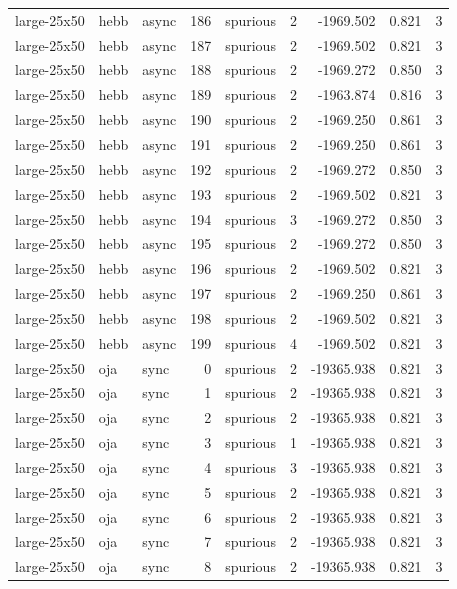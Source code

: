 \begin{tabular}{lllrlrrrr}
large-25x50 & hebb & async & 186 & spurious & 2 & -1969.502 & 0.821 & 3 \\
large-25x50 & hebb & async & 187 & spurious & 2 & -1969.502 & 0.821 & 3 \\
large-25x50 & hebb & async & 188 & spurious & 2 & -1969.272 & 0.850 & 3 \\
large-25x50 & hebb & async & 189 & spurious & 2 & -1963.874 & 0.816 & 3 \\
large-25x50 & hebb & async & 190 & spurious & 2 & -1969.250 & 0.861 & 3 \\
large-25x50 & hebb & async & 191 & spurious & 2 & -1969.250 & 0.861 & 3 \\
large-25x50 & hebb & async & 192 & spurious & 2 & -1969.272 & 0.850 & 3 \\
large-25x50 & hebb & async & 193 & spurious & 2 & -1969.502 & 0.821 & 3 \\
large-25x50 & hebb & async & 194 & spurious & 3 & -1969.272 & 0.850 & 3 \\
large-25x50 & hebb & async & 195 & spurious & 2 & -1969.272 & 0.850 & 3 \\
large-25x50 & hebb & async & 196 & spurious & 2 & -1969.502 & 0.821 & 3 \\
large-25x50 & hebb & async & 197 & spurious & 2 & -1969.250 & 0.861 & 3 \\
large-25x50 & hebb & async & 198 & spurious & 2 & -1969.502 & 0.821 & 3 \\
large-25x50 & hebb & async & 199 & spurious & 4 & -1969.502 & 0.821 & 3 \\
large-25x50 & oja & sync & 0 & spurious & 2 & -19365.938 & 0.821 & 3 \\
large-25x50 & oja & sync & 1 & spurious & 2 & -19365.938 & 0.821 & 3 \\
large-25x50 & oja & sync & 2 & spurious & 2 & -19365.938 & 0.821 & 3 \\
large-25x50 & oja & sync & 3 & spurious & 1 & -19365.938 & 0.821 & 3 \\
large-25x50 & oja & sync & 4 & spurious & 3 & -19365.938 & 0.821 & 3 \\
large-25x50 & oja & sync & 5 & spurious & 2 & -19365.938 & 0.821 & 3 \\
large-25x50 & oja & sync & 6 & spurious & 2 & -19365.938 & 0.821 & 3 \\
large-25x50 & oja & sync & 7 & spurious & 2 & -19365.938 & 0.821 & 3 \\
large-25x50 & oja & sync & 8 & spurious & 2 & -19365.938 & 0.821 & 3 \\

\end{tabular}
